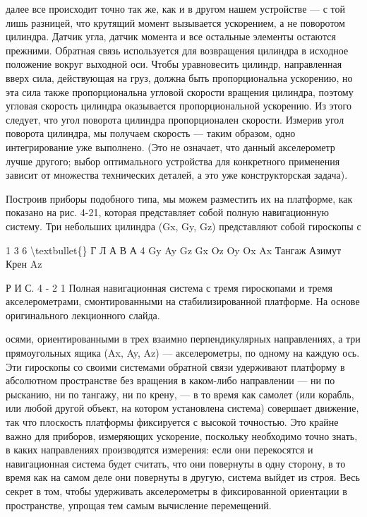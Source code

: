 \documentclass[10pt,oneside]{article}
\newcommand{\TipsSubsection}[1]{\par\vspace{6bp}{\normalsize\bfseries #1\par}\vspace{2bp}}
\begin{document}
далее все происходит точно так же, как и в другом нашем устройстве --- с той лишь разницей, что крутящий момент вызывается ускорением, а не поворотом цилиндра. Датчик угла, датчик момента и все остальные элементы остаются прежними. Обратная связь используется для возвращения цилиндра в исходное положение вокруг выходной оси. Чтобы уравновесить цилиндр, направленная вверх сила, действующая на груз, должна быть пропорциональна ускорению, но эта сила также пропорциональна угловой скорости вращения цилиндра, поэтому угловая скорость цилиндра оказывается пропорциональной ускорению. Из этого следует, что угол поворота цилиндра пропорционален скорости. Измерив угол поворота цилиндра, мы получаем скорость --- таким образом, одно интегрирование уже выполнено. (Это не означает, что данный акселерометр лучше другого; выбор оптимального устройства для конкретного применения зависит от множества технических деталей, а это уже конструкторская задача).\par

\TipsSubsection{4-8 Полная навигационная система}

Построив приборы подобного типа, мы можем разместить их на платформе, как показано на рис. 4-21, которая представляет собой полную навигационную систему. Три небольших цилиндра (Gx, Gy, Gz) представляют собой гироскопы с\par

1 3 6 \textbackslash{}textbullet\{\} Г Л А В А  4 Gy Ay Gz Gx Oz Oy Ox Ax Тангаж Азимут Крен Az\par

Р И С.  4 - 2 1 Полная навигационная система с тремя гироскопами и тремя акселерометрами, смонтированными на стабилизированной платформе. На основе оригинального лекционного слайда.\par

осями, ориентированными в трех взаимно перпендикулярных направлениях, а три прямоугольных ящика (Ax, Ay, Az) --- акселерометры, по одному на каждую ось. Эти гироскопы со своими системами обратной связи удерживают платформу в абсолютном пространстве без вращения в каком-либо направлении --- ни по рысканию, ни по тангажу, ни по крену, --- в то время как самолет (или корабль, или любой другой объект, на котором установлена система) совершает движение, так что плоскость платформы фиксируется с высокой точностью. Это крайне важно для приборов, измеряющих ускорение, поскольку необходимо точно знать, в каких направлениях производятся измерения: если они перекосятся и навигационная система будет считать, что они повернуты в одну сторону, в то время как на самом деле они повернуты в другую, система выйдет из строя. Весь секрет в том, чтобы удерживать акселерометры в фиксированной ориентации в пространстве, упрощая тем самым вычисление перемещений.\par
\end{document}
